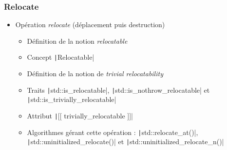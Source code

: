 \documentclass[C++.tex]{subfiles}
\begin{document}
\begin{frame}[fragile]
	\frametitle{Relocate}
	\begin{itemize}
		\item Opération \textit{relocate} (déplacement puis destruction)


		\begin{itemize}
			\item Définition de la notion \textit{relocatable}
			\item Concept \texttt|Relocatable|


			\item Définition de la notion de \textit{trivial relocatability}


			\item Traits \texttt|std::is_relocatable|, \texttt|std::is_nothrow_relocatable| et \texttt|std::is_trivially_relocatable|
			\item Attribut \texttt|[[ trivially_relocatable ]]|
			\item Algorithmes gérant cette opération : \texttt|std::relocate_at()|, \texttt|std::uninitialized_relocate()| et \texttt|std::uninitialized_relocate_n()|
		\end{itemize}
	\end{itemize}
\end{frame}
\end{document}
